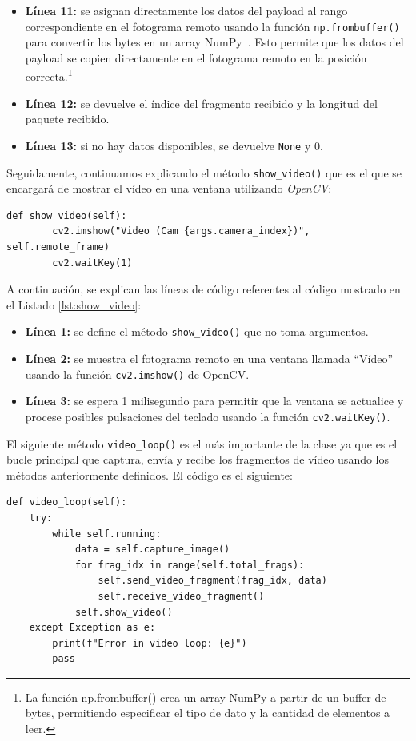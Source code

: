 \begin{itemize}
    \item \textbf{Línea 11:} se asignan directamente los datos del payload al rango correspondiente en el fotograma remoto usando la función \texttt{np.frombuffer()} para convertir los bytes en un array NumPy~\cite{numpy}. Esto permite que los datos del payload se copien directamente en el fotograma remoto en la posición correcta.\footnote{La función np.frombuffer() crea un array NumPy a partir de un buffer de bytes, permitiendo especificar el tipo de dato y la cantidad de elementos a leer.}
    \item \textbf{Línea 12:} se devuelve el índice del fragmento recibido y la longitud del paquete recibido.
    \item \textbf{Línea 13:} si no hay datos disponibles, se devuelve \texttt{None} y 0.
\end{itemize}
\vspace{\baselineskip}

Seguidamente, continuamos explicando el método \texttt{show\_video()} que es el que se encargará de mostrar el vídeo en una ventana utilizando \textit{OpenCV}:
\begin{lstlisting}[style=pythonstyle, caption={Método \texttt{show\_video()} de \textit{Minimal\_Video}.}, label={lst:show_video}]
    def show_video(self):
        cv2.imshow("Video (Cam {args.camera_index})", self.remote_frame)
        cv2.waitKey(1)
\end{lstlisting}

A continuación, se explican las líneas de código referentes al código mostrado en el Listado \ref{lst:show_video}:
\begin{itemize}
    \item \textbf{Línea 1:} se define el método \texttt{show\_video()} que no toma argumentos.
    \item \textbf{Línea 2:} se muestra el fotograma remoto en una ventana llamada ``Vídeo'' usando la función \texttt{cv2.imshow()} de OpenCV.
    \item \textbf{Línea 3:} se espera 1 milisegundo para permitir que la ventana se actualice y procese posibles pulsaciones del teclado usando la función \texttt{cv2.waitKey()}.
\end{itemize}
\vspace{\baselineskip}

El siguiente método \texttt{video\_loop()} es el más importante de la clase ya que es el bucle principal que captura, envía y recibe los fragmentos de vídeo usando los métodos anteriormente definidos. El código es el siguiente:
\begin{lstlisting}[style=pythonstyle, caption={Método \texttt{video\_loop()} de \textit{Minimal\_Video}.}, label={lst:video_loop_minimal_video}]
def video_loop(self):
    try:
        while self.running:
            data = self.capture_image()
            for frag_idx in range(self.total_frags):
                self.send_video_fragment(frag_idx, data)
                self.receive_video_fragment()
            self.show_video()
    except Exception as e:
        print(f"Error in video loop: {e}")
        pass
\end{lstlisting}

